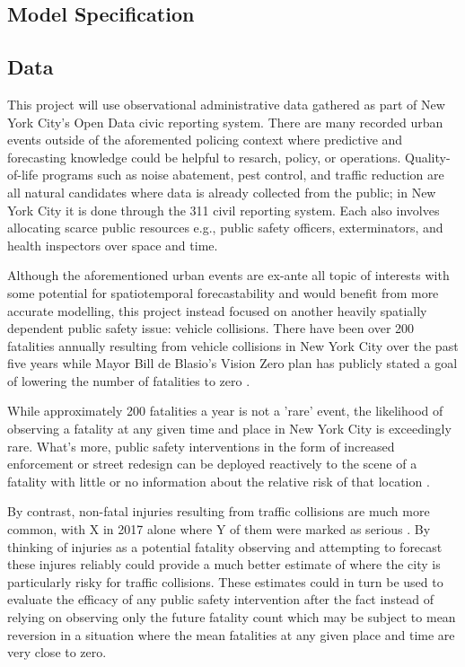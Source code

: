 \subsection{Model Specification}


\subsection{Data}

This project will use observational administrative data gathered as part of New York City's Open Data civic reporting system. There are many recorded urban events outside of the aforemented policing context where predictive and forecasting knowledge could be helpful to resarch, policy, or operations. Quality-of-life programs such as noise abatement, pest control, and traffic reduction are all natural candidates where data is already collected from the public; in New York City it is done through the 311 civil reporting system. Each also involves allocating scarce public resources e.g., public safety officers, exterminators, and health inspectors over space and time. \par

Although the aforementioned urban events are ex-ante all topic of interests with some potential for spatiotemporal forecastability and would benefit from more accurate modelling, this project instead focused on another heavily spatially dependent public safety issue: vehicle collisions. There have been over 200 fatalities annually resulting from vehicle collisions in New York City over the past five years while Mayor Bill de Blasio's Vision Zero plan has publicly stated a goal of lowering the number of fatalities to zero \cite{nyc_vz}. \par

While approximately 200 fatalities a year is not a 'rare' event, the likelihood of observing a fatality at any given time and place in New York City is exceedingly rare. What's more, public safety interventions in the form of increased enforcement or street redesign can be deployed reactively to the scene of a fatality with little or no information about the relative risk of that location . \par

By contrast, non-fatal injuries resulting from traffic collisions are much more common, with X in 2017 alone where Y of them were marked as serious . By thinking of injuries as a potential fatality observing and attempting to forecast these injures reliably could provide a much better estimate of where the city is particularly risky for traffic collisions. These estimates could in turn be used to evaluate the efficacy of any public safety intervention after the fact instead of relying on observing only the future fatality count which may be subject to mean reversion in a situation where the mean fatalities at any given place and time are very close to zero.

